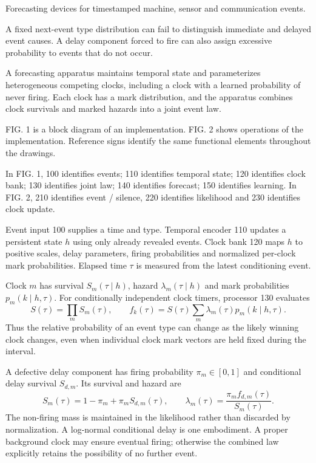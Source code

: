 \documentclass[pct]{sm-patent}
\begin{document}
\descriptionstart


\pnum Forecasting devices for timestamped machine, sensor and communication events.


\pnum A fixed next-event type distribution can fail to distinguish immediate and delayed event causes. A delay component forced to fire can also assign excessive probability to events that do not occur.


\pnum A forecasting apparatus maintains temporal state and parameterizes heterogeneous competing clocks, including a clock with a learned probability of never firing. Each clock has a mark distribution, and the apparatus combines clock survivals and marked hazards into a joint event law.


\pnum FIG. 1 is a block diagram of an implementation. FIG. 2 shows operations of the implementation. Reference signs identify the same functional elements throughout the drawings.


\pnum In FIG. 1, 100 identifies events; 110 identifies temporal state; 120 identifies clock bank; 130 identifies joint law; 140 identifies forecast; 150 identifies learning. In FIG. 2, 210 identifies event / silence, 220 identifies likelihood and 230 identifies clock update.

\pnum Event input 100 supplies a time and type. Temporal encoder 110 updates a persistent state $h$ using only already revealed events. Clock bank 120 maps $h$ to positive scales, delay parameters, firing probabilities and normalized per-clock mark probabilities. Elapsed time $\tau$ is measured from the latest conditioning event.

\pnum Clock $m$ has survival $S_m(\tau\mid h)$, hazard $\lambda_m(\tau\mid h)$ and mark probabilities $p_m(k\mid h,\tau)$. For conditionally independent clock timers, processor 130 evaluates
\[S(\tau)=\prod_m S_m(\tau),\qquad f_k(\tau)=S(\tau)\sum_m\lambda_m(\tau)p_m(k\mid h,\tau).
\]
Thus the relative probability of an event type can change as the likely winning clock changes, even when individual clock mark vectors are held fixed during the interval.

\pnum A defective delay component has firing probability $\pi_m\in[0,1]$ and conditional delay survival $S_{d,m}$. Its survival and hazard are
\[S_m(\tau)=1-\pi_m+\pi_m S_{d,m}(\tau),\qquad \lambda_m(\tau)=\frac{\pi_m f_{d,m}(\tau)}{S_m(\tau)}.
\]
The non-firing mass is maintained in the likelihood rather than discarded by normalization. A log-normal conditional delay is one embodiment. A proper background clock may ensure eventual firing; otherwise the combined law explicitly retains the possibility of no further event.
\end{document}
